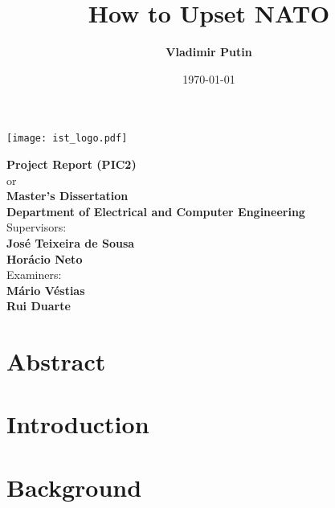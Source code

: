 \documentclass{esda}
\title{\bf \titlefont How to Upset NATO}
\author{\bf \authorfont Vladimir Putin}
\date{\today}
\begin{document}
\texttt{[image: ist\_logo.pdf]}
\vspace{2.5cm}

{\let\newpage\relax\maketitle}

\vspace{1.5cm}
\begin{center}
\begin{Large}
  {\bf Project Report (PIC2)}\\
  or\\
  {\bf Master's Dissertation}\\
  \vspace{1cm}
  {\bf Department of Electrical and Computer Engineering}\\
  \vspace{1cm}
  Supervisors:\\
  \vspace{0.5cm}
  {\bf José Teixeira de Sousa\\
  Horácio Neto}\\
  \vspace{1cm}
  Examiners:\\
  \vspace{0.5cm}
  {\bf Mário Véstias\\
  Rui Duarte}\\
\end{Large}
\end{center}

\cleardoublepage
{}
\setcounter{page}{1}

\section*{Abstract}


\cleardoublepage
\tableofcontents
\listoftables
\listoffigures

\cleardoublepage
{}
\setcounter{page}{1}

\cleardoublepage
\section{Introduction}
\label{sec:intro}


\cleardoublepage
\section{Background}
\label{sec:back}

\end{document}
